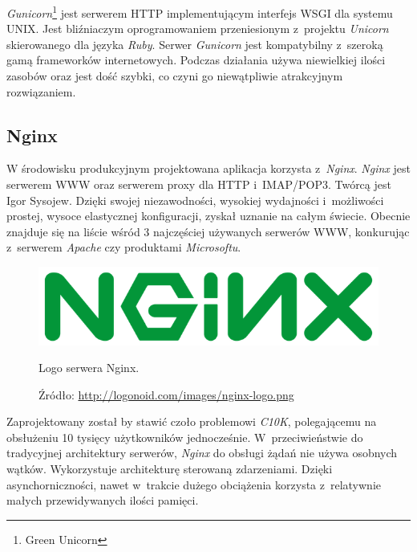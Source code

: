 \documentclass[a4paper,12pt,oneside]{mwrep}  %
\begin{document}
\emph{Gunicorn}\footnote{Green Unicorn} jest serwerem HTTP implementującym interfejs WSGI dla systemu UNIX. Jest bliźniaczym oprogramowaniem przeniesionym z~projektu \emph{Unicorn} skierowanego dla języka \emph{Ruby}. Serwer \emph{Gunicorn} jest kompatybilny z~szeroką gamą frameworków internetowych. Podczas działania używa niewielkiej ilości zasobów oraz jest dość szybki, co czyni go niewątpliwie atrakcyjnym rozwiązaniem. %
\subsection{Nginx}
W środowisku produkcyjnym projektowana aplikacja korzysta z~\emph{Nginx}.
\emph{Nginx} jest serwerem WWW oraz serwerem proxy dla HTTP i~IMAP/POP3. Twórcą jest Igor Sysojew. Dzięki swojej niezawodności, wysokiej wydajności i~możliwości prostej, wysoce elastycznej konfiguracji, zyskał uznanie na całym świecie. Obecnie znajduje się na liście wśród 3 najczęściej używanych serwerów WWW, konkurując z~serwerem \emph{Apache} czy produktami \emph{Microsoftu}. %
\begin{figure}[h]
\centering
\includegraphics[width=1\textwidth/3]{grafika/loga/nginx.png}
\caption{Logo serwera Nginx.}
\vspace{-0.8cm}
\caption*{\scriptsize Źródło: \url{http://logonoid.com/images/nginx-logo.png}}
\label{logo_nginx}
\end{figure}

Zaprojektowany został by stawić czoło problemowi \emph{C10K}, polegającemu na obsłużeniu 10 tysięcy użytkowników jednocześnie. W~przeciwieństwie do tradycyjnej architektury serwerów, \emph{Nginx} do obsługi żądań nie używa osobnych wątków. Wykorzystuje architekturę sterowaną zdarzeniami. Dzięki asynchorniczności, nawet w~trakcie dużego obciążenia korzysta z~relatywnie małych przewidywanych ilości pamięci. %
\end{document}
